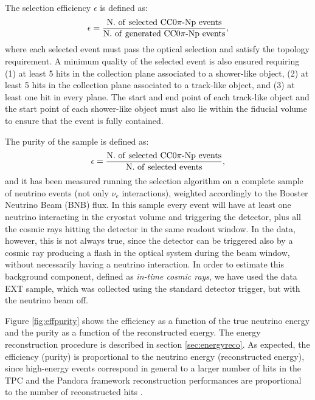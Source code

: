 The selection efficiency $\epsilon$ is defined as:
\begin{equation}
\epsilon = \frac{\mathrm{N.~of~selected~CC0}\pi\mathrm{{\text -}Np~events}}{\mathrm{N.~of~generated~CC0}\pi\mathrm{{\text -}Np~events}},
\end{equation}
where each selected event must pass the optical selection and satisfy the topology requirement. A minimum quality of the selected event is also ensured requiring (1) at least 5 hits in the collection plane associated to a shower-like object, (2) at least 5 hits in the collection plane associated to a track-like object, and (3) at least one hit in every plane.
The start and end point of each track-like object and the start point of each shower-like object must also lie within the fiducial volume to ensure that the event is fully contained.

The purity of the sample is defined as:
\begin{equation}
\epsilon = \frac{\mathrm{N.~of~selected~CC0}\pi\mathrm{{\text -}Np~events}}{\mathrm{N.~of~selected~events}},
\end{equation}
and it has been measured running the selection algorithm on a complete sample of neutrino events (not only $\nu_{e}$ interactions), weighted accordingly to the Booster Neutrino Beam (BNB) flux. In this sample every event will have at least one neutrino interacting in the cryostat volume and triggering the detector, plus all the cosmic rays hitting the detector in the same readout window. In the data, however, this is not always true, since the detector can be triggered also by a cosmic ray producing a flash in the optical system during the beam window, without necessarily having a neutrino interaction. In order to estimate this background component, defined as \emph{in-time cosmic rays}, we have used the data EXT sample, which was collected using the standard detector trigger, but with the neutrino beam off.

Figure \ref{fig:effpurity} shows the efficiency as a function of the true neutrino energy and the purity as a function of the reconstructed energy. The energy reconstruction procedure is described in section \ref{sec:energyreco}.
As expected, the efficiency (purity) is proportional to the neutrino energy (reconstructed energy), since high-energy events correspond in general to a larger number of hits in the TPC and the Pandora framework reconstruction performances are proportional to the number of reconstructed hits 
\cite{pandora2}. 

